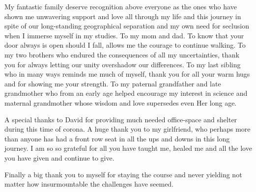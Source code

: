 My fantastic family deserve recognition above everyone as the ones who have shown me unwavering support and love all
through my life and this journey in spite of our long-standing geographical separation and my own need for seclusion
when I immerse myself in my studies. To my mom and dad. To know that your door always is open should I fall, allows me
the courage to continue walking. To my two brothers who endured the consequences of all my uncertainties, thank you for
always letting our unity overshadow our differences. To my last sibling who in many ways reminds me much of myself,
thank you for all your warm hugs and for showing me your strength. To my paternal grandfather and late grandmother
who from an early age helped encourage my interest in science and maternal grandmother whose wisdom and love supersedes even
Her long age.

A special thanks to David for providing much needed office-space and shelter during this time of corona.
A huge thank you to my girlfriend, who perhaps more than anyone has had a front row seat in all the ups and downs
in this long journey. I am so so grateful for all you have taught me, healed me and all the love you have given and continue to give.

Finally a big thank you to myself for staying the course and never yielding not matter how insurmountable the challenges
have seemed.
